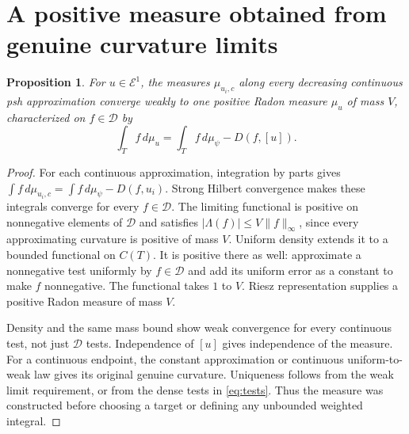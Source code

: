 \documentclass[11pt]{article}
\newtheorem{proposition}[theorem]{Proposition}
\newcommand{\E}{\mathcal E}
\newcommand{\DF}{\mathcal D}
\begin{document}
\section{A positive measure obtained from genuine curvature limits}

\begin{proposition}\label{prop:measure}
For $u\in\E^1$, the measures $\mu_{u_i,c}$ along every decreasing
continuous psh approximation converge weakly to one positive Radon
measure $\mu_u$ of mass $V$, characterized on $f\in\DF$ by
\begin{equation}\label{eq:tests}
 \int_Tf\,d\mu_u=\int_Tf\,d\mu_\psi-D(f,[u]).
\end{equation}
\end{proposition}
\begin{proof}
For each continuous approximation, integration by parts gives
$\int f\,d\mu_{u_i,c}=\int f\,d\mu_\psi-D(f,u_i)$.
Strong Hilbert convergence makes these integrals converge for every
$f\in\DF$. The limiting functional is positive on nonnegative
elements of $\DF$ and satisfies
$|\Lambda(f)|\leq V\|f\|_\infty$, since every approximating
curvature is positive of mass $V$. Uniform density extends it to
a bounded functional on $C(T)$. It is positive there as well:
approximate a nonnegative test uniformly by $f\in\DF$ and add
its uniform error as a constant to make $f$ nonnegative.
The functional takes $1$ to $V$. Riesz representation supplies a
positive Radon measure of mass $V$.

Density and the same mass bound show weak convergence for every
continuous test, not just $\DF$ tests. Independence of $[u]$ gives
independence of the measure. For a continuous endpoint, the
constant approximation or continuous uniform-to-weak law gives
its original genuine curvature. Uniqueness follows from the weak
limit requirement, or from the dense tests in \eqref{eq:tests}.
Thus the measure was constructed before choosing a target or
defining any unbounded weighted integral.
\end{proof}
\end{document}
